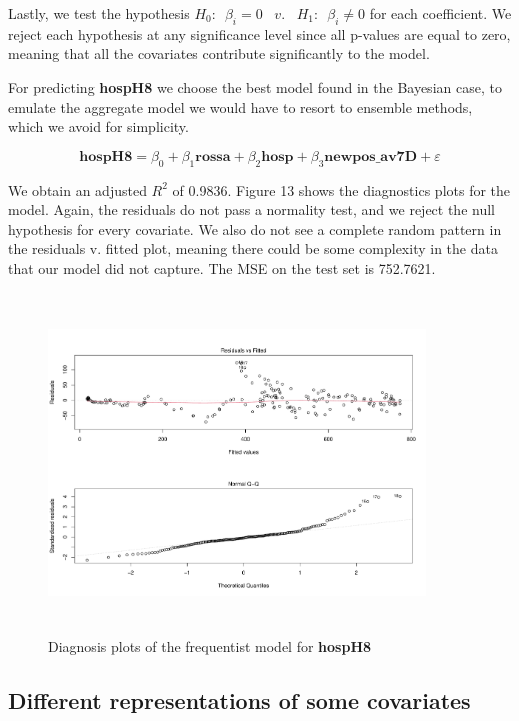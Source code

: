 \documentclass[12pt,a4paper]{article}
\theoremstyle{definition}
\theoremstyle{remark}
\begin{document}
\begin{appendices}
	Lastly, we test the hypothesis $H_0: \,\,\, \beta_i = 0 \,\,\,\,\, v. \,\,\,\,\, H_1: \,\,\,\beta_i \neq 0$ for each coefficient. We reject each hypothesis at any significance level since all p-values are equal to zero, meaning that all the covariates contribute significantly to the model.
	
	For predicting \textbf{hospH8} we choose the best model found in the Bayesian case, to emulate the aggregate model we would have to resort to ensemble methods, which we avoid for simplicity. 
	
		\begin{dmath*}
		\textbf{hospH8} = \beta_0 + \beta_1\textbf{rossa} +  \beta_2\textbf{hosp} + \beta_3\textbf{newpos\_av7D} + \varepsilon
	\end{dmath*}
	
	We obtain an adjusted $R^2$ of 0.9836. Figure 13 shows the diagnostics plots for the model.  Again, the residuals do not pass a normality test, and we reject the null hypothesis for every covariate. We also do not see a complete random pattern in the residuals v. fitted plot, meaning there could be some complexity in the data that our model did not capture. The MSE on the test set is 752.7621.
	
		\begin{figure}[htb!]
		\centering
		\includegraphics[width=100mm, height=90mm,scale=0.5]{diagnostics2.pdf}
		\caption{Diagnosis plots of the frequentist model for \textbf{hospH8}}
	\end{figure}

    \clearpage
    \subsection{Different representations of some covariates}

\end{appendices}
\end{document}
